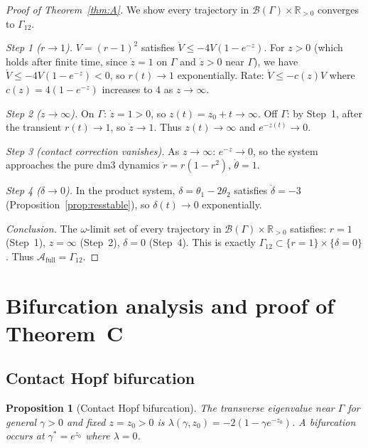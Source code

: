 \documentclass[12pt, oneside]{book}
\theoremstyle{plain}
\newtheorem{proposition}[theorem]{Proposition}
\theoremstyle{definition}
\theoremstyle{remark}
\newcommand{\R}{\mathbb{R}}
\newcommand{\Orb}{\Gamma}
\newcommand{\cB}{\mathcal{B}}
\begin{document}
\begin{proof}[Proof of Theorem~\ref{thm:A}]
We show every trajectory in $\cB(\Orb)\times\R_{>0}$ converges to
$\Orb_{12}$.

\emph{Step 1 ($r\to 1$).}
$V=(r-1)^2$ satisfies $\dot V\le-4V(1-e^{-z})$.
For $z>0$ (which holds after finite time, since $\dot z=1$ on $\Orb$
and $\dot z>0$ near $\Orb$), we have $\dot V\le-4V(1-e^{-z})<0$,
so $r(t)\to 1$ exponentially. Rate: $\dot V\le-c(z)V$ where
$c(z)=4(1-e^{-z})$ increases to $4$ as $z\to\infty$.

\emph{Step 2 ($z\to\infty$).}
On $\Orb$: $\dot z=1>0$, so $z(t)=z_0+t\to\infty$.
Off $\Orb$: by Step~1, after the transient $r(t)\to 1$, so
$\dot z\to 1$. Thus $z(t)\to\infty$ and $e^{-z(t)}\to 0$.

\emph{Step 3 (contact correction vanishes).}
As $z\to\infty$: $e^{-z}\to 0$, so the system approaches the
pure dm3 dynamics $\dot r=r(1-r^2)$, $\dot\theta=1$.

\emph{Step 4 ($\delta\to 0$).}
In the product system, $\delta=\theta_1-2\theta_2$ satisfies
$\dot\delta=-3$ (Proposition~\ref{prop:resstable}), so
$\delta(t)\to 0$ exponentially.

\emph{Conclusion.}
The $\omega$-limit set of every trajectory in $\cB(\Orb)\times\R_{>0}$
satisfies: $r=1$ (Step~1), $z=\infty$ (Step~2), $\delta=0$ (Step~4).
This is exactly $\Orb_{12}\subset\{r=1\}\times\{\delta=0\}$.
Thus $\mathcal{A}_{\mathrm{full}}=\Orb_{12}$.
\end{proof}

\section{Bifurcation analysis and proof of Theorem~C}\label{sec:bifurcations}

\subsection{Contact Hopf bifurcation}

\begin{proposition}[Contact Hopf bifurcation]\label{prop:hopf}
The transverse eigenvalue near $\Orb$ for general $\gamma>0$ and
fixed $z=z_0>0$ is $\lambda(\gamma,z_0)=-2(1-\gamma e^{-z_0})$.
A bifurcation occurs at $\gamma^*=e^{z_0}$ where $\lambda=0$.
\end{proposition}
\end{document}
